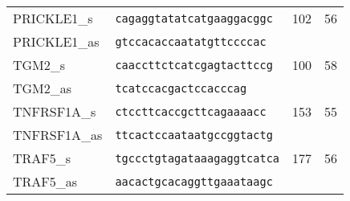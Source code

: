\begin{spacing}{1}
{\begin{longtable}{|l|l|p{2cm}|p{2cm}|}
            \hhline{====}
            PRICKLE1\_s  & \texttt{cagaggtatatcatgaaggacggc}                                                                                         & 102 & 56                         \\
            \hhline{--~~}
            PRICKLE1\_as & \texttt{gtccacaccaatatgttccccac}                                                                                          &     &                            \\
            \hhline{====}
            TGM2\_s      & \texttt{caaccttctcatcgagtacttccg}                                                                                         & 100 & 58                         \\
            \hhline{--~~}
            TGM2\_as     & \texttt{tcatccacgactccacccag}                                                                                             &     &                            \\
            \hhline{====}
            TNFRSF1A\_s  & \texttt{ctccttcaccgcttcagaaaacc}                                                                                          & 153 & 55                         \\
            \hhline{--~~}
            TNFRSF1A\_as & \texttt{ttcactccaataatgccggtactg}                                                                                         &     &                            \\
            \hhline{====}
            TRAF5\_s     & \texttt{tgccctgtagataaagaggtcatca}                                                                                        & 177 & 56                         \\
            \hhline{--~~}
            TRAF5\_as    & \texttt{aacactgcacaggttgaaataagc}                                                                                         &     &                            \\
        \end{longtable}
    }
\end{spacing}









